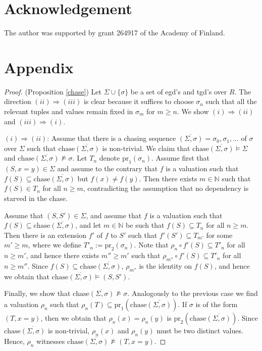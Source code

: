 \documentclass[envcountset]{llncs}
\newcommand{\si}{\sigma}
\newcommand{\Si}{\Sigma}
\newcommand{\sub}{\subseteq}
\newcommand{\pr}{\mathrm{pr}}
\newcommand{\N}{\mathbb{N}}
\newcommand{\chase}[1]{\overline{(#1)}}
\newcommand{\ochase}[1]{\textrm{chase}\overline{(#1)}}
\begin{document}
\section*{Acknowledgement}
The author was supported by grant 264917 of the Academy of Finland.


\newpage
\section*{Appendix}

\begin{proof}(Proposition \ref{chase})
Let $\Si\cup\{\si\}$ be a set of egd's and tgd's over $R$. The direction 
$(ii)\Rightarrow (iii)$ is clear because it suffices to choose $\si_n$ such that all the relevant tuples and values remain fixed in $\si_{m}$ for $m\geq n$. We show $(i)\Rightarrow (ii)$ and $(iii)\Rightarrow (i)$.

$(i)\Rightarrow (ii)$: Assume that there is a chasing sequence $\chase{\Si,\si}=\si_0, \si_1,\ldots $ of $\si$ over $\Si$ such that  $\ochase{\Si,\si}$ is non-trivial. We claim that $\ochase{\Si,\si}\models \Si$ and $\ochase{\Si,\si} \not\models \si$. Let $T_n$  denote $\pr_1(\si_n)$. Assume first that $(S,x=y)\in \Si$ and assume to the contrary that $f$ is a valuation such that $f(S) \sub \ochase{\Si,\si}$ but $f(x)\neq f(y)$. Then there exists $m \in \N$ such that  $f(S)\in T_n$ for all $n\geq m$, contradicting the assumption that no dependency is starved in the chase. 

Assume that $(S,S')\in \Si$, and assume that $f$ is a valuation such that $f(S) \sub \ochase{\Si,\si}$, and let $m \in \N$ be such that  $f(S)\sub T_n$ for all $n\geq m$. Then there is an extension $f'$ of $f$ to $S'$ such that $f'(S')\sub T_{m'}$ for some $m'\geq m$, where we define $T'_n:=\pr_2(\si_n)$. Note that  $\rho_n\circ f'(S) \sub T'_n$ for all $n\geq m'$, and  hence there exists $m''\geq m'$ such that $\rho_{m''}\circ f' (S) \sub T'_{n}$ for all $n \geq m''$.
Since $f(S) \sub \ochase{\Si,\si}$,  $\rho_{m''}$ is the identity on $f(S)$, and hence we obtain that $\ochase{\Si,\si}\models (S,S')$.

Finally, we show that $\ochase{\Si,\si}\not\models \si$. Analogously to the previous case we find a valuation $\rho_n$ such that $\rho_n(T) \sub \pr_1(\ochase{\Si,\si})$. If $\si$ is of the form $(T,x=y)$, then we obtain that $\rho_n(x)=\rho_n(y)$ is $\pr_2(\ochase{\Si,\si})$. Since $\ochase{\Si,\si}$ is non-trivial, $\rho_n(x)$ and $\rho_n(y)$ must  be two distinct values. Hence, $\rho_n$  witnesses $\ochase{\Si,\si}\not\models (T,x=y)$. 


\end{proof}
\end{document}
